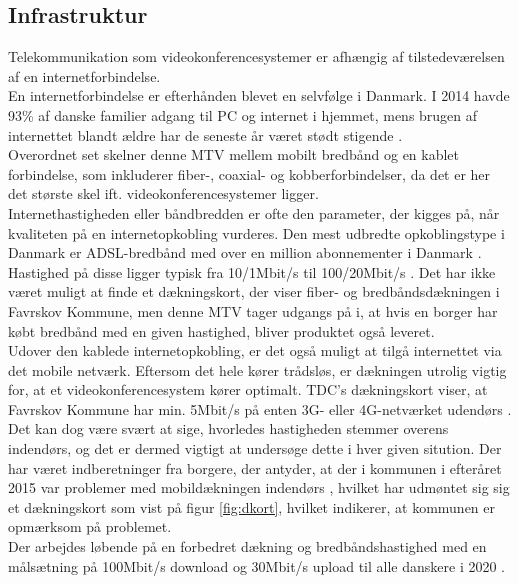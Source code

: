\subsection{Infrastruktur}
Telekommunikation som videokonferencesystemer er afhængig af tilstedeværelsen af en  internetforbindelse.\\
En internetforbindelse er efterhånden blevet en selvfølge i Danmark. I 2014 havde 93\% af danske familier adgang til PC og internet i hjemmet, mens brugen af internettet blandt ældre har de seneste år været stødt stigende \cite{itanvendelse2014}.
\\Overordnet set skelner denne MTV mellem mobilt bredbånd og en kablet forbindelse, som inkluderer fiber-, coaxial- og kobberforbindelser, da det er her det største skel ift. videokonferencesystemer ligger.\\
Internethastigheden eller båndbredden er ofte den parameter, der kigges på, når kvaliteten på en internetopkobling vurderes. Den mest udbredte opkoblingstype i Danmark er ADSL-bredbånd med over en million abonnementer i Danmark \parencite{statadsl}. Hastighed på disse ligger typisk fra 10/1Mbit/s til 100/20Mbit/s \parencite{tdchastigheder} \parencite{telenorhastigheder}. Det har ikke været muligt at finde et dækningskort, der viser fiber- og bredbåndsdækningen i Favrskov Kommune, men denne MTV tager udgangs på i, at hvis en borger har købt bredbånd med en given hastighed, bliver produktet også leveret.\\
Udover den kablede internetopkobling, er det også muligt at tilgå internettet via det mobile netværk. Eftersom det hele kører trådsløs, er dækningen utrolig vigtig for, at et videokonferencesystem kører optimalt. TDC's dækningskort viser, at Favrskov Kommune har min. 5Mbit/s på enten 3G- eller 4G-netværket udendørs \parencite{tdcdaekning}. Det kan dog være svært at sige, hvorledes hastigheden stemmer overens indendørs, og det er dermed vigtigt at undersøge dette i hver given sitution. Der har været indberetninger fra borgere, der antyder, at der i kommunen i efteråret 2015 var problemer med mobildækningen indendørs \parencite{tv2oj_daekning}, hvilket har udmøntet sig sig et dækningskort som vist på figur \ref{fig:dkort}, hvilket indikerer, at kommunen er opmærksom på problemet.\\
Der arbejdes løbende på en forbedret dækning og bredbåndshastighed med en målsætning på 100Mbit/s download og 30Mbit/s upload til alle danskere i 2020 \parencite{digitalvel}.
